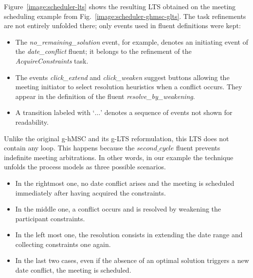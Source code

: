 Figure~\ref{image:scheduler-lts} shows the resulting LTS obtained on the meeting scheduling example from Fig.~\ref{image:scheduler-ghmsc-glts}. The task refinements are not entirely unfolded there; only events used in fluent definitions were kept:
\begin{itemize}
\item The \emph{no\_remaining\_solution} event, for example, denotes an initiating event of the \emph{date\_conflict} fluent; it belongs to the refinement of the \emph{AcquireConstraints} task. 
\item The events \emph{click\_extend} and \emph{click\_weaken} suggest buttons allowing the meeting initiator to select resolution heuristics when a conflict occurs. They appear in the definition of the fluent \emph{resolve\_by\_weakening}. 
\item A transition labeled with `$\ldots$' denotes a sequence of events not shown for readability.
\end{itemize}

Unlike the original g-hMSC and its g-LTS reformulation, this LTS does not contain any loop. This happens because the $second\_cycle$ fluent prevents indefinite meeting arbitrations. In other words, in our example the technique unfolds the process models as three possible scenarios. 
\begin{itemize}
\item In the rightmost one, no date conflict arises and the meeting is scheduled immediately after having acquired the constraints. 
\item In the middle one, a conflict occurs and is resolved by weakening the participant constraints. 
\item In the left most one, the resolution consists in extending the date range and collecting constraints one again. \item In the last two cases, even if the absence of an optimal solution triggers a new date conflict, the meeting is scheduled. 
\end{itemize}

